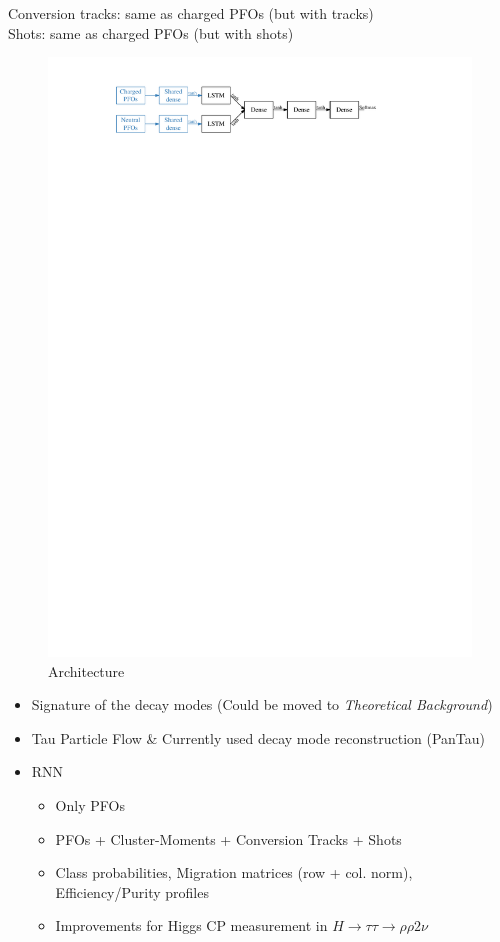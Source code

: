 Conversion tracks: same as charged PFOs (but with tracks) \\
Shots: same as charged PFOs (but with shots) \\

\begin{figure}[ht]
  \centering
  \includegraphics{./figures/decay_mode_classification/baseline_architecture.pdf}
  \caption{Architecture}
  \label{fig:pfo_rnn_baseline_arch}
\end{figure}

\begin{itemize}
\item Signature of the decay modes (Could be moved to \textit{Theoretical
    Background})
\item Tau Particle Flow \& Currently used decay mode reconstruction (PanTau)
\item RNN
  \begin{itemize}
  \item Only PFOs
  \item PFOs + Cluster-Moments + Conversion Tracks + Shots
  \item Class probabilities, Migration matrices (row + col. norm),
    Efficiency/Purity profiles
  \item Improvements for Higgs CP measurement in
    $H \rightarrow \tau\tau \rightarrow \rho \rho 2\nu$
  \end{itemize}
\end{itemize}


